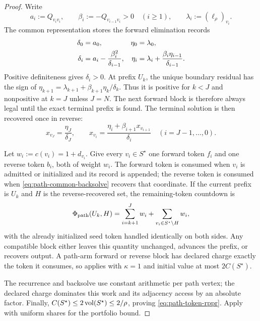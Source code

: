 \begin{proof}
Write
\[
 a_i:=Q_{v_i v_i},
 \qquad
 \beta_i:=-Q_{v_{i-1}v_i}>0\quad(i\geq1),
 \qquad
 \lambda_i:=(\ell_\rho)_{v_i}.
\]
The common representation stores the forward elimination records
\begin{align}
 \delta_0&=a_0,& \eta_0&=\lambda_0,\notag\\
 \delta_i&=a_i-\frac{\beta_i^2}{\delta_{i-1}},&
 \eta_i&=\lambda_i+\frac{\beta_i\eta_{i-1}}{\delta_{i-1}}.
 \label{eq:path-common-schur-record}
\end{align}
Positive definiteness gives $\delta_i>0$.  At prefix $U_k$, the unique
boundary residual has the sign of
$\eta_{k+1}=\lambda_{k+1}+\beta_{k+1}\eta_k/\delta_k$.
Thus it is positive for $k<J$ and nonpositive at $k=J$ unless $J=N$.
The next forward block is therefore always legal until the exact terminal
prefix is found.  The terminal solution is then recovered once in reverse:
\begin{equation}
 x_{v_J}=\frac{\eta_J}{\delta_J},
 \qquad
 x_{v_i}=\frac{\eta_i+\beta_{i+1}x_{v_{i+1}}}{\delta_i}
 \quad(i=J-1,\ldots,0).
 \label{eq:path-common-backsolve}
\end{equation}

Let $w_i:=c(v_i)=1+d_{v_i}$.  Give every $v_i\in S^\star$ one forward
token $f_i$ and one reverse token $b_i$, both of weight $w_i$.  The forward
token is consumed when $v_i$ is admitted or initialized and its record is
appended; the reverse token is consumed when
\eqref{eq:path-common-backsolve} recovers that coordinate.  If the current
prefix is $U_k$ and $H$ is the reverse-recovered set, the remaining-token
countdown is
\begin{equation}
 \Phi_{\rm path}(U_k,H)
 =\sum_{i=k+1}^{J}w_i
  +\sum_{v_i\in S^\star\setminus H}w_i,
 \label{eq:path-token-potential}
\end{equation}
with the already initialized seed token handled identically on both sides.
Any compatible block either leaves this quantity unchanged, advances the
prefix, or recovers output.  A path-arm forward or reverse block has declared
charge exactly the token it consumes, so
 applies with $\kappa=1$ and initial
value at most $2C(S^\star)$.

The recurrence and backsolve use constant arithmetic per path vertex; the
declared charge dominates this work and its adjacency access by an absolute
factor.  Finally,
$C(S^\star)\leq2\operatorname{vol}(S^\star)\leq2/\rho$, proving
\eqref{eq:path-token-rppr}.  Apply
 with uniform shares for the portfolio bound.
\end{proof}

